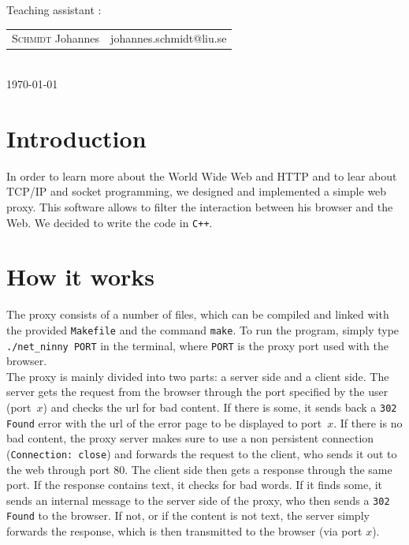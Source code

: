 \documentclass[12pt,a4paper]{article}
\begin{document}
\begin{titlepage}
\normalsize
Teaching assistant :\\[0.2cm]
{\begin{tabular}{ll}
\textsc{Schmidt} Johannes & johannes.schmidt@liu.se \\
\end{tabular}}
\\[2cm]

\vfill
{\normalsize \today} %

\newpage

\end{titlepage}




\section{Introduction}
In order to learn more about the World Wide Web and HTTP and to lear about TCP/IP and socket programming, we designed and implemented a simple web proxy. This software allows to filter the interaction between his browser and the Web. We decided to write the code in \texttt{C++}.

\section{How it works}
The proxy consists of a number of files, which can be compiled and linked with the provided \texttt{Makefile} and the command \texttt{make}. To run the program, simply type \texttt{./net\_ninny PORT} in the terminal, where \texttt{PORT} is the proxy port used with the browser.\\

The proxy is mainly divided into two parts: a server side and a client side. The server gets the request from the browser through the port specified by the user (port~$x$) and checks the url for bad content. If there is some, it sends back a \texttt{302 Found} error with the url of the error page to be displayed to port~$x$. If there is no bad content, the proxy server makes sure to use a non persistent connection (\texttt{Connection: close}) and forwards the request to the client, who sends it out to the web through port 80. The client side then gets a response through the same port. If the response contains text, it checks for bad words. If it finds some, it sends an internal message to the server side of the proxy, who then sends a \texttt{302 Found} to the browser. If not, or if the content is not text, the server simply forwards the response, which is then transmitted to the browser (via port $x$).
\end{document}
